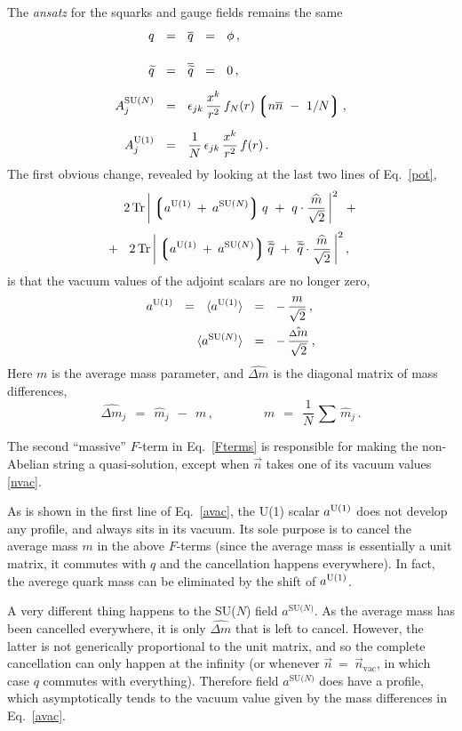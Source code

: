 \documentclass[12pt]{article}
\def\beq{\begin{equation}}
\def\eeq{\end{equation}}
\newcommand{\wt}{\widetilde}
\newcommand{\ov}{\overline}
\newcommand{\lgr}{\left\lgroup}
\newcommand{\rgr}{\right\rgroup}
\newcommand{\aU}{a^{\rm U(1)}}
\newcommand{\aN}{a^\text{SU($N$)}}
\newcommand{\nnbar}{n\ov{n}}
\newcommand{\qt}{\wt{q}}
\newcommand{\bq}{\ov{q}}
\newcommand{\bqt}{\overline{\widetilde{q}}}
\newcommand{\Tr}{\text{Tr}}
\newcommand{\dm}{\hat{{\scriptstyle \Delta} m}}
\newcommand{\mhat}{\widehat{m}}
\newcommand{\nvac}{\vec{n}{}_\text{vac}}
\newcommand{\ansatz}{{\it ansatz} }
\begin{document}
	The \ansatz for the squarks and gauge fields remains the same
\begin{align}
%
\notag
	q    & ~~=~~    \bq    ~~=~~    \phi\,,    \\[4mm]
%
\notag
	\qt    & ~~=~~    \bqt    ~~=~~    0\,,    \\[2mm]
%
\label{qAansatz}
	A_j^\text{SU($N$)}    & ~~=~~    \epsilon_{jk}\, \frac{x^k}{r^2}\, f_N(r) \lgr \nnbar ~-~ 1/N \rgr ,
	\\[2mm]
%
\notag
	A_j^\text{U(1)}    & ~~=~~    \frac{1}{N}\, \epsilon_{jk}\, \frac{x^k}{r^2}\, f(r)\,.
\end{align}
	The first obvious change, revealed by looking at the last two lines of Eq.~\eqref{pot}, 
\begin{align}
%
\notag
	&
	\phantom{~~+~~}
	2\, \Tr\, \bigg| \lgr \aU \:+\: \aN \rgr q  ~+~  q \cdot \frac{\mhat}{\sqrt{2}} \,\bigg|^2
	~~+~~
	\\[1mm]
%
\label{Fterms}
	&
	~~+~~
	2\, \Tr\, \bigg| \lgr \aU \:+\: \aN \rgr \bqt  ~+~  \bqt \cdot \frac{\mhat}{\sqrt{2}} \,\bigg|^2
	\,,
\end{align}
	is that the vacuum values of the adjoint scalars are no longer zero,
\begin{align}
%
\notag
	\aU    ~~=~~    \langle \aU \rangle    & ~~=~~    -\, \frac{m}{\sqrt{2}}\,,
	\\
%
\label{avac}
	\langle \aN \rangle    & ~~=~~ -\, \frac{\dm}{\sqrt{2}}\,,
\end{align}
	Here $ m $ is the average mass parameter, and $ \dm $ is the diagonal matrix of mass differences,
\beq
	\dm{}_j    ~~=~~    \mhat{}_j  ~~-~~  m\,,
	\qquad\qquad
	m    ~~=~~ \frac{1}{N}\, \sum\, \mhat{}_j\,.
\eeq
	
	The second ``massive'' $ F $-term in Eq.~\eqref{Fterms} is responsible for making the non-Abelian string a quasi-solution, except when $ \vec{n} $ takes one of its vacuum values \eqref{nvac}.
	
	As is shown in the first line of Eq.~\eqref{avac}, the U(1) scalar $ \aU $ does not develop
	any profile, and always sits in its vacuum.
	Its sole purpose is to cancel the average mass $ m $ in the above $ F $-terms 
	(since the average mass is essentially a unit matrix, it commutes with $ q $ and the 
	cancellation happens everywhere). In fact, the averege quark mass can be 
	eliminated by the shift of $ \aU $.

	A very different thing happens to the SU($N$) field $ \aN $.
	As the average mass has been cancelled everywhere, it is only $ \dm $ that is left to cancel.
	However, the latter is not generically proportional to the unit matrix, and so the complete cancellation
	can only happen at the infinity (or whenever $ \vec{n} ~=~ \nvac $, in which
	case $ q $ commutes with everything).
	Therefore field $ \aN $ does have a profile, 
	which asymptotically tends to the vacuum value given by the mass differences in Eq.~\eqref{avac}.
\end{document}
